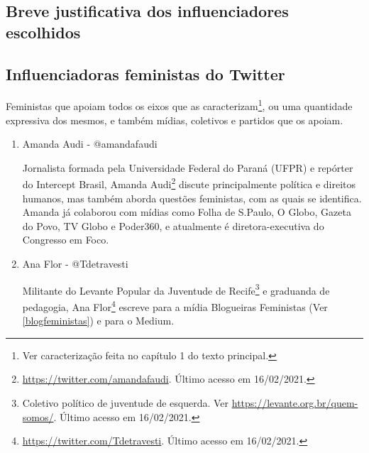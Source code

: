 \documentclass[
	12pt,				%
	openright,			%
	twoside,			%
	a4paper,			%
	english,			%
	brazil				%
	]{abntex2}
\begin{document}



 \begin{anexosenv}

 \partanexos

 \chapter{Breve justificativa dos influenciadores escolhidos}\label{justificativa}

 \section*{Influenciadoras feministas do Twitter}
 Feministas que apoiam todos os eixos que as caracterizam\footnote{Ver caracterização feita no capítulo 1 do texto principal.}, ou uma quantidade expressiva dos mesmos, e também mídias, coletivos e partidos que os apoiam.
 
\begin{enumerate}

\subsection*{Pessoas públicas}

 \item Amanda Audi - @amandafaudi
 
 Jornalista formada pela Universidade Federal do Paraná (UFPR) e repórter do Intercept Brasil, Amanda Audi\footnote{\url{https://twitter.com/amandafaudi}. Último acesso em 16/02/2021.} discute principalmente política e direitos humanos, mas também aborda questões feministas, com as quais se identifica. Amanda já colaborou com mídias como Folha de S.Paulo, O Globo, Gazeta do Povo, TV Globo e Poder360, e atualmente é diretora-executiva do Congresso em Foco.

 \item Ana Flor - @Tdetravesti
 
 Militante do Levante Popular da Juventude de Recife\footnote{Coletivo político de juventude de esquerda. Ver \url{https://levante.org.br/quem-somos/}. Último acesso em 16/02/2021.} e graduanda de pedagogia, Ana Flor\footnote{\url{https://twitter.com/Tdetravesti}. Último acesso em 16/02/2021.} escreve para a mídia Blogueiras Feministas (Ver \ref{blogfeministas}) e para o Medium.
 

\end{enumerate}
\end{anexosenv}
\end{document}
